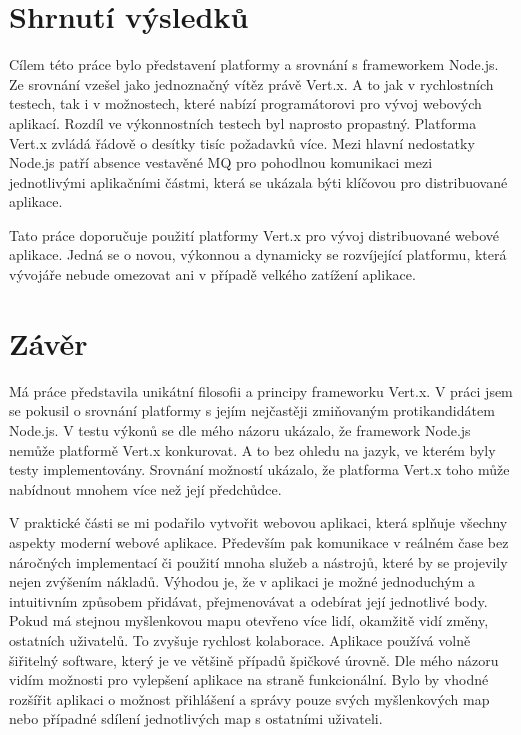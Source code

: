 
\chapter[Shrnutí výsledků]{Shrnutí výsledků}

Cílem této práce bylo představení platformy a srovnání s frameworkem Node.js. Ze srovnání vzešel jako jednoznačný vítěz  právě Vert.x. A to jak v rychlostních testech, tak i v možnostech, které nabízí programátorovi pro vývoj webových aplikací. Rozdíl ve výkonnostních testech byl naprosto propastný. Platforma Vert.x zvládá řádově o desítky tisíc požadavků více. Mezi hlavní nedostatky Node.js patří absence vestavěné MQ pro pohodlnou komunikaci mezi jednotlivými aplikačními částmi, která se ukázala býti klíčovou pro distribuované aplikace.

Tato práce doporučuje použití platformy Vert.x pro vývoj distribuované webové aplikace. Jedná se o novou, výkonnou a dynamicky se rozvíjející platformu, která vývojáře nebude omezovat ani v případě velkého zatížení aplikace.

\chapter[Závěr]{Závěr}

Má práce představila unikátní filosofii a principy frameworku Vert.x. V práci jsem se pokusil o srovnání platformy s jejím nejčastěji zmiňovaným protikandidátem Node.js. V testu výkonů se dle mého názoru ukázalo, že framework Node.js nemůže platformě Vert.x konkurovat. A to bez ohledu na jazyk, ve kterém byly testy implementovány. Srovnání možností ukázalo, že platforma Vert.x toho může nabídnout mnohem více než její předchůdce. 

V praktické části se  mi podařilo vytvořit webovou aplikaci, která splňuje všechny aspekty moderní webové aplikace. Především pak komunikace v reálném čase bez náročných implementací či použití mnoha služeb a nástrojů, které by se projevily nejen zvýšením nákladů. Výhodou je, že v aplikaci je možné jednoduchým a intuitivním způsobem přidávat, přejmenovávat a odebírat její jednotlivé body. Pokud má stejnou myšlenkovou mapu otevřeno více lidí, okamžitě vidí změny, ostatních uživatelů. To zvyšuje rychlost kolaborace. Aplikace používá volně šiřitelný software, který je ve většině případů špičkové úrovně. %
Dle mého názoru vidím možnosti pro vylepšení aplikace na straně funkcionální. Bylo by vhodné rozšířit aplikaci o možnost přihlášení a správy pouze svých myšlenkových map nebo případné sdílení jednotlivých map s ostatními uživateli.

